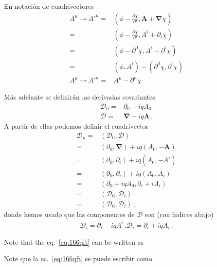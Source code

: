 En notaci\'on de cuadrivectores
\begin{align}
  A^\mu\to {A'}^\mu=&\left(\phi-\frac{\partial\chi}{\partial t},\mathbf{A}+\boldsymbol{\nabla}\chi
  \right)\nonumber\\
  =&\left(\phi-\frac{\partial\chi}{\partial t},A^{i}+\partial_i\chi
  \right)\nonumber\\
  =&\left(\phi-\partial^0\chi,A^{i}-\partial^{i}\chi
  \right)\nonumber\\
  =&\left(\phi,A^{i}
  \right)-
  \left(
    \partial^0\chi,\partial^{i}\chi
  \right)\nonumber\\
  \label{eq:aphicov}
  A^\mu\to {A'}^\mu=&A^\mu-\partial^\mu\chi
\end{align}




Más adelante se definirán las derivadas  covariantes
\begin{align}
   \mathcal{D}_0=&\partial_0+i q A_0\nonumber\\
  \boldsymbol{\mathcal{D}}=&\boldsymbol{\nabla}-i q \mathbf{A}\,.
\end{align}
A partir de ellas podemos definir el cuadrivector
\begin{align}
  \mathcal{D}_\mu=&(\mathcal{D}_0,\boldsymbol{\mathcal{D}})\nonumber\\
=&(\partial_0,\boldsymbol{\nabla})+i q(A_0,-\mathbf{A})\nonumber\\
=&(\partial_0,\partial_i)+i q(A_0,-A^i)\nonumber\\
=&(\partial_0,\partial_i)+i q(A_0,A_i)\nonumber\\
=&(\partial_0+i q A_0,\partial_i+i A_i)\nonumber\\
=&(\mathcal{D}_0,\mathcal{D}_i)\nonumber\\
=&(\mathcal{D}_0,\mathcal{D}_i)\,,
\end{align}
donde hemos usado que las componentes de $\mathcal{D}$ son (con índices abajo)
\begin{align}
\mathcal{D}_i=\partial_i-i q A^i\,.
  \mathcal{D}_i=\partial_i+i q A_i\,.
\end{align}

\begin{english}
Note that the eq.~\eqref{eq:166qft} can be written as  
\end{english}
\begin{spanish}
Note que la ec.~\eqref{eq:166qft} se puede escribir como
\end{spanish}

